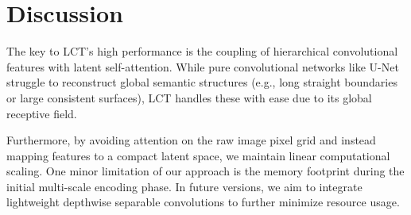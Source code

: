 \section{Discussion}
The key to LCT's high performance is the coupling of hierarchical convolutional features with latent self-attention. While pure convolutional networks like U-Net struggle to reconstruct global semantic structures (e.g., long straight boundaries or large consistent surfaces), LCT handles these with ease due to its global receptive field. 

Furthermore, by avoiding attention on the raw image pixel grid and instead mapping features to a compact latent space, we maintain linear computational scaling. One minor limitation of our approach is the memory footprint during the initial multi-scale encoding phase. In future versions, we aim to integrate lightweight depthwise separable convolutions to further minimize resource usage.
